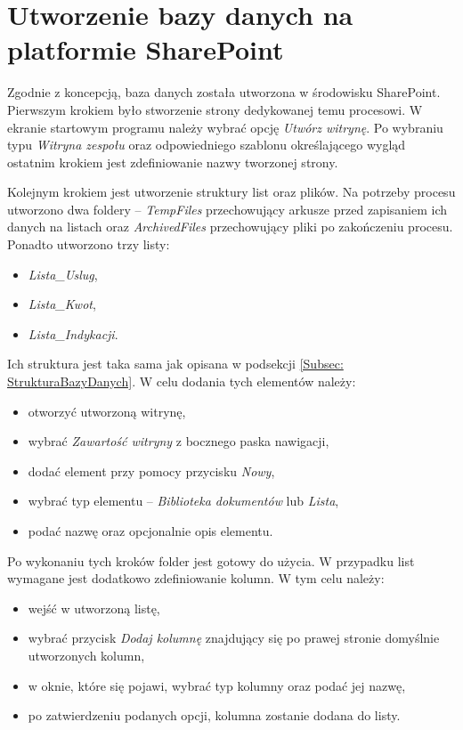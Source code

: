 \section{Utworzenie bazy danych na platformie SharePoint}

Zgodnie z koncepcją, baza danych została utworzona w środowisku SharePoint. Pierwszym krokiem było stworzenie strony dedykowanej temu procesowi. W ekranie startowym programu należy wybrać opcję \emph{Utwórz witrynę}. Po wybraniu typu \emph{Witryna zespołu} oraz odpowiedniego szablonu określającego wygląd ostatnim krokiem jest zdefiniowanie nazwy tworzonej strony.

Kolejnym krokiem jest utworzenie struktury list oraz plików. Na potrzeby procesu utworzono dwa foldery -- \emph{TempFiles} przechowujący arkusze przed zapisaniem ich danych na listach oraz \emph{ArchivedFiles} przechowujący pliki po zakończeniu procesu.
Ponadto utworzono trzy listy:
\begin{itemize}
    \item \emph{Lista\_Uslug},
    \item \emph{Lista\_Kwot},
    \item \emph{Lista\_Indykacji}.
\end{itemize}
\hfill \break
Ich struktura jest taka sama jak opisana w podsekcji \ref{Subsec: StrukturaBazyDanych}.
W celu dodania tych elementów należy:
\begin{itemize}
    \item otworzyć utworzoną witrynę,
    \item wybrać \emph{Zawartość witryny} z bocznego paska nawigacji,
    \item dodać element przy pomocy przycisku \emph{Nowy},
    \item wybrać typ elementu -- \emph{Biblioteka dokumentów} lub \emph{Lista},
    \item podać nazwę oraz opcjonalnie opis elementu.
\end{itemize}

Po wykonaniu tych kroków folder jest gotowy do użycia. W przypadku list wymagane jest dodatkowo zdefiniowanie kolumn. W tym celu należy:
\begin{itemize}
    \item wejść w utworzoną listę,
    \item wybrać przycisk \emph{Dodaj kolumnę} znajdujący się po prawej stronie domyślnie utworzonych kolumn,
    \item w oknie, które się pojawi, wybrać typ kolumny oraz podać jej nazwę,
    \item po zatwierdzeniu podanych opcji, kolumna zostanie dodana do listy.
\end{itemize}

